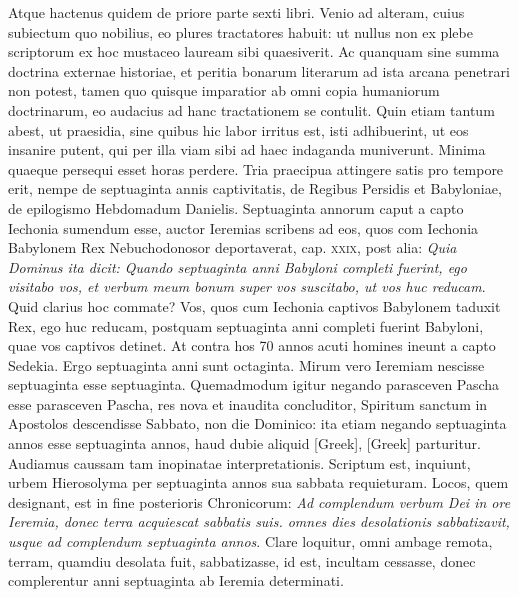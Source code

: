 Atque hactenus quidem de
priore parte sexti libri.
Venio ad alteram, cuius subiectum quo nobilius,
eo plures tractatores habuit: ut nullus non ex plebe scriptorum
ex hoc mustaceo lauream sibi quaesiverit.
Ac quanquam sine
summa doctrina externae historiae, et peritia bonarum literarum
ad ista arcana penetrari non potest, tamen quo quisque imparatior
ab omni copia humaniorum doctrinarum, eo audacius ad hanc
tractationem se contulit.
Quin etiam tantum abest, ut praesidia,
sine quibus hic labor irritus est, isti adhibuerint, ut eos insanire
putent, qui per illa viam sibi ad haec indaganda muniverunt.
Minima quaeque persequi esset horas perdere.
Tria praecipua attingere
satis pro tempore erit, nempe de septuaginta annis captivitatis,
de Regibus Persidis et Babyloniae, de epilogismo Hebdomadum
Danielis.
Septuaginta annorum caput a capto Iechonia sumendum
esse, auctor Ieremias scribens ad eos, quos com Iechonia Babylonem
Rex Nebuchodonosor deportaverat, cap. \textsc{xxix}, post
alia: \textit{Quia Dominus ita dicit: Quando septuaginta anni Babyloni completi
fuerint, ego visitabo vos, et verbum meum bonum super vos
suscitabo, ut vos huc reducam}.
Quid clarius hoc commate?
Vos,
quos cum Iechonia captivos Babylonem taduxit Rex, ego huc
reducam, postquam septuaginta anni completi fuerint Babyloni,
quae vos captivos detinet.
At contra hos 70 annos acuti homines
ineunt a capto Sedekia.
Ergo septuaginta anni sunt octaginta.
Mirum vero Ieremiam nescisse septuaginta esse septuaginta.
Quemadmodum
igitur negando parasceven Pascha esse parasceven
Pascha, res nova et inaudita concluditor, Spiritum sanctum in 
Apostolos descendisse Sabbato, non die Dominico: ita etiam
negando septuaginta annos esse septuaginta annos, haud dubie
aliquid \textgreek{[Greek]}, \textgreek{[Greek]} parturitur.
Audiamus
caussam tam inopinatae interpretationis.
Scriptum est, inquiunt, urbem
Hierosolyma per septuaginta annos sua sabbata requieturam.
Locos, quem designant, est in fine posterioris Chronicorum:
\textit{Ad complendum verbum Dei in ore Ieremia,
 donec terra acquiescat sabbatis
suis. omnes dies desolationis sabbatizavit, usque ad complendum
septuaginta annos}.
Clare loquitur, omni ambage remota, terram,
quamdiu desolata fuit, sabbatizasse, id est, incultam cessasse, donec
complerentur anni septuaginta ab Ieremia determinati.

